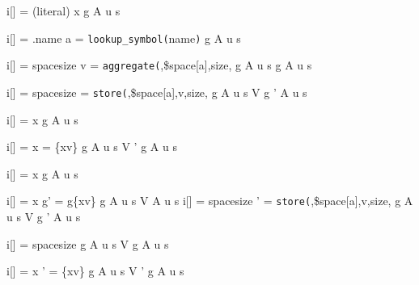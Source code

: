 

{i[\pc] = (literal)\textrm{ }x}
{\step
  {\dstate}
  {\state {} \rho \spt g \sigma A u s}
}

{i[\pc] = .name \andalso a = \texttt{lookup\_symbol(}name\texttt{)}}
{\step
  {\dstate}
  {\state {} \rho \spt g \sigma A u s}
}

{i[\pc] = \dash{}space\dash{}size \andalso v = \texttt{aggregate(}\sigma,\$space[a],size,\dash{}}
{\step
  {\state {} \rho \spt g \sigma A u s}
  {\state {} \rho \spt g \sigma A u s}
}

{i[\pc] = \dash{}space\dash{}size  = \texttt{store(}\sigma,\$space[a],v,size,\dash{}}
{\step
  {\state {} \rho \spt g \sigma A u s}
  {\state \newpc V \rho \spt g {\sigma'} A u s}
}

{i[\pc] = \dash{}\dash{}x}
{\step
  {\dstate}
  {\state {} \rho \spt g \sigma A u s}
}

{i[\pc] = \dash{}\dash{}x  = \rho\{x\mapsto{}v\}}
{\step
  {\state {} \rho \spt g \sigma A u s}
  {\state \newpc V {\rho'} \spt g \sigma A u s}
}

{i[\pc] = \dash{}\dash{}x}
{\step
  {\dstate}
  {\state {} \rho \spt g \sigma A u s}
}

{i[\pc] = \dash{}\dash{}x \andalso g' = g\{x\mapsto{}v\}}
{\step
  {\state {} \rho \spt g \sigma A u s}
  {\state \newpc V \rho {} \sigma A u s}
}
{\twoline
{i[\pc] = \dash{}\dash{}space\dash{}size}
{{\sigma'} = \texttt{store(}\sigma,\$space[a],v,size,\dash{}}
}
{\step
  {\state {} \rho \spt g \sigma A u s}
  {\state \newpc V \rho \spt g {\sigma'} A u s}
}


{i[\pc] = \dash{}\dash{}space\dash{}size}
{\step
  {\state {} \rho \spt g \sigma A u s}
  {\state \newpc V \rho \spt g \sigma A u s}
}

{\twoline
{i[\pc] = \dash{}\dash{}\dash{}x}
{\rho' = \rho\{x\mapsto{}v\}}
}
{\step
  {\state {} \rho \spt g \sigma A u s}
  {\state \newpc V {\rho'} \spt g \sigma A u s}
}

